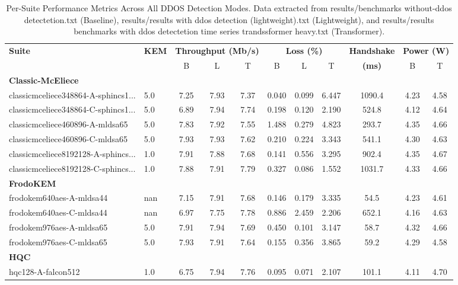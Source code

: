 \begin{table}[htbp]
\centering
\caption{Per-Suite Performance Metrics Across All DDOS Detection Modes. Data extracted from results/benchmarks without-ddos detectetion.txt (Baseline), results/results with ddos detection (lightweight).txt (Lightweight), and results/results benchmarks with ddos detectetion time series trandssformer heavy.txt (Transformer).}
\label{tab:per_suite_metrics}
\small
\begin{tabular}{@{}llccccccccc@{}}
\toprule
\textbf{Suite} & \textbf{KEM} & \multicolumn{3}{c}{\textbf{Throughput (Mb/s)}} & \multicolumn{3}{c}{\textbf{Loss (\%)}} & \textbf{Handshake} & \multicolumn{2}{c}{\textbf{Power (W)}} \\
 &  & B & L & T & B & L & T & \textbf{(ms)} & B & T \\
\midrule
\multicolumn{11}{l}{\textbf{Classic-McEliece}}\\
classicmceliece348864-A-sphincs1... & 5.0 & 7.25 & 7.93 & 7.37 & 0.040 & 0.099 & 6.447 & 1090.4 & 4.23 & 4.58 \\
classicmceliece348864-C-sphincs1... & 5.0 & 6.89 & 7.94 & 7.74 & 0.198 & 0.120 & 2.190 & 524.8 & 4.12 & 4.64 \\
classicmceliece460896-A-mldsa65 & 5.0 & 7.83 & 7.92 & 7.55 & 1.488 & 0.279 & 4.823 & 293.7 & 4.35 & 4.66 \\
classicmceliece460896-C-mldsa65 & 5.0 & 7.93 & 7.93 & 7.62 & 0.210 & 0.224 & 3.343 & 541.1 & 4.30 & 4.63 \\
classicmceliece8192128-A-sphincs... & 1.0 & 7.91 & 7.88 & 7.68 & 0.141 & 0.556 & 3.295 & 902.4 & 4.35 & 4.67 \\
classicmceliece8192128-C-sphincs... & 1.0 & 7.88 & 7.91 & 7.79 & 0.327 & 0.086 & 1.552 & 1031.7 & 4.33 & 4.66 \\
\midrule
\multicolumn{11}{l}{\textbf{FrodoKEM}}\\
frodokem640aes-A-mldsa44 & nan & 7.15 & 7.91 & 7.68 & 0.146 & 0.179 & 3.335 & 54.5 & 4.23 & 4.61 \\
frodokem640aes-C-mldsa44 & nan & 6.97 & 7.75 & 7.78 & 0.886 & 2.459 & 2.206 & 652.1 & 4.16 & 4.63 \\
frodokem976aes-A-mldsa65 & 5.0 & 7.91 & 7.94 & 7.69 & 0.450 & 0.101 & 3.147 & 58.7 & 4.32 & 4.66 \\
frodokem976aes-C-mldsa65 & 5.0 & 7.93 & 7.91 & 7.64 & 0.155 & 0.356 & 3.865 & 59.2 & 4.29 & 4.58 \\
\midrule
\multicolumn{11}{l}{\textbf{HQC}}\\
hqc128-A-falcon512 & 1.0 & 6.75 & 7.94 & 7.76 & 0.095 & 0.071 & 2.107 & 101.1 & 4.11 & 4.70 \\

\end{tabular}
\end{table}
